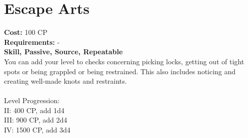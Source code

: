 \section{Escape Arts}
\textbf{Cost:} 100 CP\\
\textbf{Requirements:} -\\
\textbf{Skill, Passive, Source, Repeatable}\\
You can add your level to checks concerning picking locks, getting out of tight spots or being grappled or being restrained. This also includes noticing and creating well-made knots and restraints.\\
\\
Level Progression:\\
II: 400 CP, add 1d4\\
III: 900 CP, add 2d4\\
IV: 1500 CP, add 3d4\\
